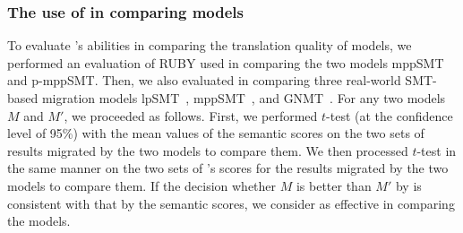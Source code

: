 \subsubsection{The use of {\model} in comparing models}
To evaluate {\model}'s abilities in comparing the translation quality
of models, we performed an evaluation of RUBY used in comparing
the two models mppSMT and p-mppSMT.
%
Then, we also evaluated {\model} in comparing three real-world
SMT-based migration models lpSMT~\cite{fse13}, mppSMT~\cite{ase15},
and GNMT~\cite{gnmt}.  
%
For any two models $M$ and $M'$, we proceeded as follows. First, we
performed $t$-test (at the confidence level of 95\%) with the mean
values of the semantic scores on the two sets of results migrated by
the two models to compare them. We then processed $t$-test in the same
manner on the two sets of {\model}'s scores for the results migrated
by the two models to compare them. If the decision whether $M$ is
better than $M'$ by {\model} is consistent with that by the semantic
scores, we consider {\model} as effective in comparing the models.



